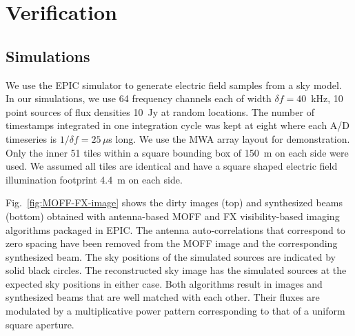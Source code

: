 \documentclass[a4paper,fleqn,usenatbib]{../mnras}
\begin{document}
\section{Verification}\label{sec:verify}

\subsection{Simulations}\label{sec:sim}

We use the EPIC simulator to generate electric field samples from a sky model. In
our simulations, we use 64 frequency channels each of width $\delta f = 40$~kHz, 
10 point sources of flux densities 10~Jy at random locations. The number of
timestamps integrated in one integration cycle was kept at eight where each A/D 
timeseries is $1/\delta f=25\,\mu$s long. We use the MWA array layout 
\citep{bea12} for demonstration. Only the inner 51 tiles within a square bounding
box of 150~m on each side were used. We assumed all tiles are identical and have 
a square shaped electric field illumination footprint 4.4~m on each side. 

Fig.~\ref{fig:MOFF-FX-image} shows the dirty images (top) and synthesized beams
(bottom) obtained with antenna-based MOFF and FX visibility-based imaging 
algorithms packaged in EPIC. The antenna auto-correlations that correspond to 
zero spacing have been removed from the MOFF image and the corresponding 
synthesized beam. The sky positions of the simulated sources are indicated by 
solid black circles. The reconstructed sky image has the simulated sources at the
expected sky positions in either case. Both algorithms result in images and 
synthesized beams that are well matched with each other. Their fluxes are 
modulated by a multiplicative power pattern corresponding to that of a uniform
square aperture. 
\end{document}
